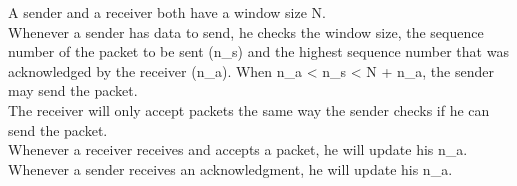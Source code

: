 A sender and a receiver both have a window size N. \\
Whenever a sender has data to send, he checks the window size, the sequence number of the packet to be sent (n_s) and the highest sequence number that was acknowledged by the receiver (n_a).
When n_a < n_s < N + n_a, the sender may send the packet. \\
The receiver will only accept packets the same way the sender checks if he can send the packet. \\
Whenever a receiver receives and accepts a packet, he will update his n_a. \\
Whenever a sender receives an acknowledgment, he will update his n_a.